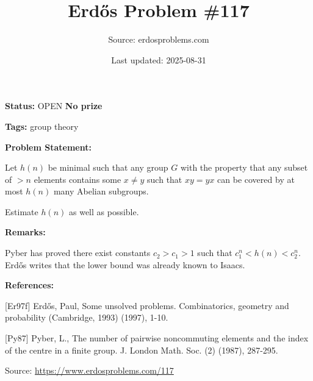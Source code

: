 \documentclass{article}
\title{Erd\H{o}s Problem \#117}
\date{Last updated: 2025-08-31}
\author{Source: erdosproblems.com}
\begin{document}
\maketitle

\noindent\textbf{Status:} OPEN \quad \textbf{No prize}

\noindent\textbf{Tags:} group theory

\medskip
\noindent\textbf{Problem Statement:}

Let $h(n)$ be minimal such that any group $G$ with the property that any subset of $>n$ elements contains some $x\neq y$ such that $xy=yx$ can be covered by at most $h(n)$ many Abelian subgroups.

Estimate $h(n)$ as well as possible.

\bigskip
\noindent\textbf{Remarks:}

Pyber \cite{Py87} has proved there exist constants $c_2>c_1>1$ such that $c_1^n<h(n)<c_2^n$. Erd\H{o}s \cite{Er97f} writes that the lower bound was already known to Isaacs.

\bigskip
\noindent\textbf{References:}

[Er97f] Erd\H{o}s, Paul, Some unsolved problems. Combinatorics, geometry and probability (Cambridge, 1993) (1997), 1-10.
 
 [Py87] Pyber, L., The number of pairwise noncommuting elements and the index of the centre in a finite group. J. London Math. Soc. (2) (1987), 287-295.

\bigskip
\noindent\small{Source: \url{https://www.erdosproblems.com/117}}
\end{document}
